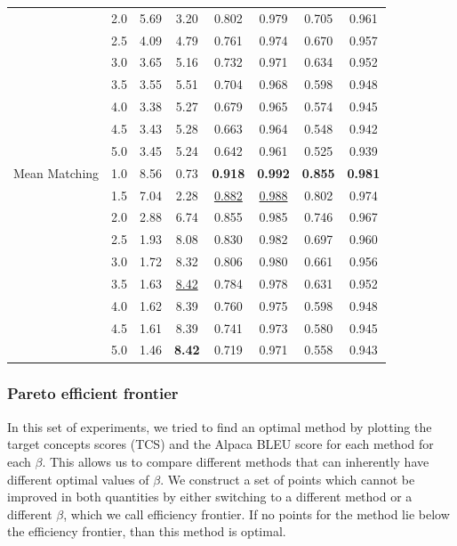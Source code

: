 \begin{table}[htbp]
\begin{tabular}{l|l|cccccc|}
 & 2.0 & 5.69 & 3.20 & 0.802 & 0.979 & 0.705 & 0.961 \\
 & 2.5 & 4.09 & 4.79 & 0.761 & 0.974 & 0.670 & 0.957 \\
 & 3.0 & 3.65 & 5.16 & 0.732 & 0.971 & 0.634 & 0.952 \\
 & 3.5 & 3.55 & 5.51 & 0.704 & 0.968 & 0.598 & 0.948 \\
 & 4.0 & 3.38 & 5.27 & 0.679 & 0.965 & 0.574 & 0.945 \\
 & 4.5 & 3.43 & 5.28 & 0.663 & 0.964 & 0.548 & 0.942 \\
 & 5.0 & 3.45 & 5.24 & 0.642 & 0.961 & 0.525 & 0.939 \\
\hline
Mean Matching & 1.0 & 8.56 & 0.73 & \textbf{0.918} & \textbf{0.992} & \textbf{0.855} & \textbf{0.981} \\
 & 1.5 & 7.04 & 2.28 & \underline{0.882} & \underline{0.988} & 0.802 & 0.974 \\
 & 2.0 & 2.88 & 6.74 & 0.855 & 0.985 & 0.746 & 0.967 \\
 & 2.5 & 1.93 & 8.08 & 0.830 & 0.982 & 0.697 & 0.960 \\
 & 3.0 & 1.72 & 8.32 & 0.806 & 0.980 & 0.661 & 0.956 \\
 & 3.5 & 1.63 & \underline{8.42} & 0.784 & 0.978 & 0.631 & 0.952 \\
 & 4.0 & 1.62 & 8.39 & 0.760 & 0.975 & 0.598 & 0.948 \\
 & 4.5 & 1.61 & 8.39 & 0.741 & 0.973 & 0.580 & 0.945 \\
 & 5.0 & 1.46 & \textbf{8.42} & 0.719 & 0.971 & 0.558 & 0.943 \\
\hline
\end{tabular}
\end{table}



\subsubsection{Pareto efficient frontier}

In this set of experiments, we tried to find an optimal method by plotting the target concepts scores (TCS) and the Alpaca BLEU score for each method for each $\beta$. This allows us to compare different methods that can inherently have different optimal values of $\beta$. We construct a set of points which cannot be improved in both quantities by either switching to a different method or a different $\beta$, which we call efficiency frontier. If no points for the method lie below the efficiency frontier, than this method is optimal.

